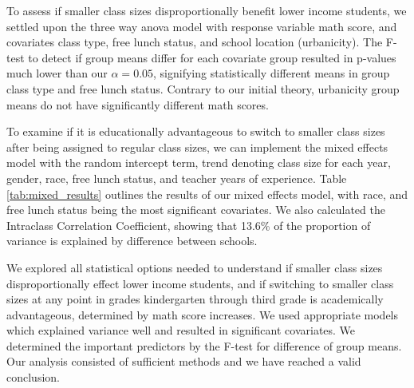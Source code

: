 \documentclass[11pt]{article}
\begin{document}
To assess if smaller class sizes disproportionally benefit lower income students, we settled upon the three way anova model with response variable math score, and covariates class type, free lunch status, and school location (urbanicity). The F-test to detect if group means differ for each covariate group resulted in p-values much lower than our $\alpha=0.05$, signifying statistically different means in group class type and free lunch status. Contrary to our initial theory, urbanicity group means do not have significantly different math scores. 

To examine if it is educationally advantageous to switch to smaller class sizes after being assigned to regular class sizes, we can implement the mixed effects model with the random intercept term, trend denoting class size for each year, gender, race, free lunch status, and teacher years of experience. Table \ref{tab:mixed_results} outlines the results of our mixed effects model, with race, and free lunch status being the most significant covariates. We also calculated the Intraclass Correlation Coefficient, showing that 13.6\% of the proportion of variance is explained by difference between schools. 

We explored all statistical options needed to understand if smaller class sizes disproportionally effect lower income students, and if switching to smaller class sizes at any point in grades kindergarten through third grade is academically advantageous, determined by math score increases. We used appropriate models which explained variance well and resulted in significant covariates. We determined the important predictors by the F-test for difference of group means. Our analysis consisted of sufficient methods and we have reached a valid conclusion. 



\end{document}
